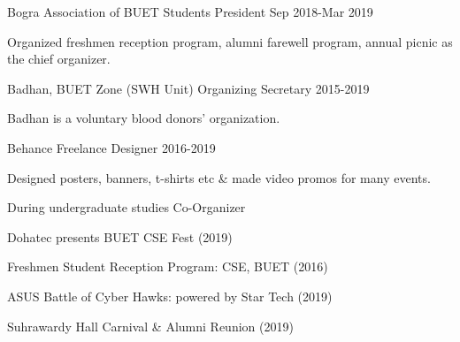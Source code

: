 \begin{cventries}
  \cventry   
    {Bogra Association of BUET Students}
    {President}
    {}
    {Sep 2018-Mar 2019}
    {
      \begin{cvitems} %
        \item {Organized freshmen reception program, alumni farewell program, annual picnic as the chief organizer.}
      \end{cvitems}
    }
    
  \cventry
    {Badhan, BUET Zone (SWH Unit)}
    {Organizing Secretary}
    {}
    {2015-2019}
    {
      \begin{cvitems} %
        \item {Badhan is a voluntary blood donors' organization.}
      \end{cvitems}
    }
    
  \cventry
    {Behance}
    {Freelance Designer}
    {}
    {2016-2019}
    {
      \begin{cvitems} %
        \item {Designed posters, banners, t-shirts etc \& made video promos for many events.}
      \end{cvitems}
    }
    
  \cventry
    {During undergraduate studies}
    {Co-Organizer}
    {}
    {}
    {
      \begin{cvitems} %
        \item {Dohatec presents BUET CSE Fest (2019)}
        \item {Freshmen Student Reception Program: CSE, BUET (2016)}
        \item {ASUS Battle of Cyber Hawks: powered by Star Tech (2019)}
        \item {Suhrawardy Hall Carnival \& Alumni Reunion (2019)}
      \end{cvitems}
    }

\end{cventries}
